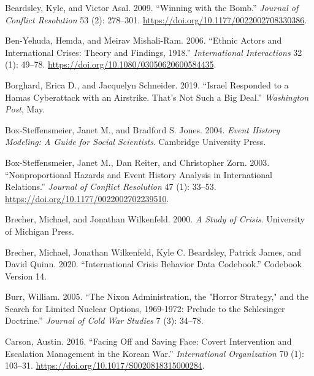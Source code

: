 \documentclass[
]{article}
\newlength{\cslhangindent}
\newlength{\cslentryspacingunit} %
\newenvironment{CSLReferences}[2] %
 {%
  \setlength{\parindent}{0pt}
  \ifodd #1
  \let\oldpar\par
  \def\par{\hangindent=\cslhangindent\oldpar}
  \fi
  \setlength{\parskip}{#2\cslentryspacingunit}
 }%
 {}
\begin{document}
\begin{CSLReferences}{1}{0}
\leavevmode{}%
Beardsley, Kyle, and Victor Asal. 2009. {``Winning with the {Bomb}.''} \emph{Journal of Conflict Resolution} 53 (2): 278--301. \url{https://doi.org/10.1177/0022002708330386}.

\leavevmode{}%
Ben-Yehuda, Hemda, and Meirav Mishali-Ram. 2006. {``Ethnic {Actors} and {International Crises}: {Theory} and {Findings}, 1918.''} \emph{International Interactions} 32 (1): 49--78. \url{https://doi.org/10.1080/03050620600584435}.

\leavevmode{}%
Borghard, Erica D., and Jacquelyn Schneider. 2019. {``Israel Responded to a {Hamas} Cyberattack with an Airstrike. {That}'s Not Such a Big Deal.''} \emph{Washington Post}, May.

\leavevmode{}%
Box-Steffensmeier, Janet M., and Bradford S. Jones. 2004. \emph{Event {History Modeling}: {A Guide} for {Social Scientists}}. {Cambridge University Press}.

\leavevmode{}%
Box-Steffensmeier, Janet M., Dan Reiter, and Christopher Zorn. 2003. {``Nonproportional {Hazards} and {Event History Analysis} in {International Relations}.''} \emph{Journal of Conflict Resolution} 47 (1): 33--53. \url{https://doi.org/10.1177/0022002702239510}.

\leavevmode{}%
Brecher, Michael, and Jonathan Wilkenfeld. 2000. \emph{A {Study} of {Crisis}}. {University of Michigan Press}.

\leavevmode{}%
Brecher, Michael, Jonathan Wilkenfeld, Kyle C. Beardsley, Patrick James, and David Quinn. 2020. {``International {Crisis Behavior Data Codebook}.''} Codebook Version 14.

\leavevmode{}%
Burr, William. 2005. {``The {Nixon Administration}, the "{Horror Strategy}," and the {Search} for {Limited Nuclear Options}, 1969-1972: {Prelude} to the {Schlesinger Doctrine}.''} \emph{Journal of Cold War Studies} 7 (3): 34--78.

\leavevmode{}%
Carson, Austin. 2016. {``Facing {Off} and {Saving Face}: {Covert Intervention} and {Escalation Management} in the {Korean War}.''} \emph{International Organization} 70 (1): 103--31. \url{https://doi.org/10.1017/S0020818315000284}.


\end{CSLReferences}
\end{document}
